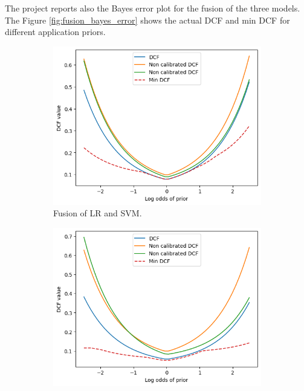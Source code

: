 \documentclass{article}
\begin{document}
The project reports also the Bayes error plot for the fusion of the three models. The Figure \ref{fig:fusion_bayes_error} shows the actual DCF and min DCF for different application priors.

\begin{figure}[ht]
    \centering
    \begin{subfigure}[b]{0.45\textwidth}
        \centering
        \includegraphics[width=\textwidth]{images/calibration_lr_svm_bayes_error.png}
        \caption{Fusion of LR and SVM.}
    \end{subfigure}
    \hfill
    \begin{subfigure}[b]{0.45\textwidth}
        \centering
        \includegraphics[width=\textwidth]{images/calibration_lr_gmm_bayes_error.png}

\end{subfigure}
\end{figure}
\end{document}

